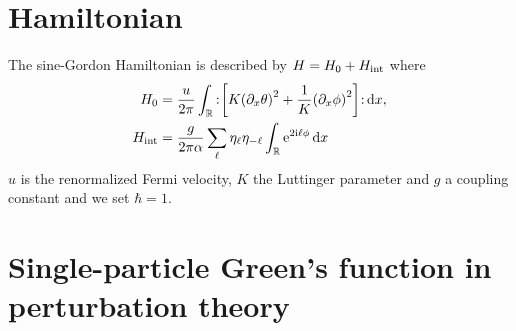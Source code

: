 \documentclass[english, parskip=full]{scrartcl}
\title{\titel}
\author{\autor}
\date{\today}
\begin{document}
\maketitle  %

\section{Hamiltonian}
The sine-Gordon Hamiltonian is described by $H=H_0+H_{\text{int}}$ where
\begin{align}
H_0 &= \frac{u}{2\pi} \intr{\normord{\klb*{K\kla*{\partial_x\theta}^2 + \frac{1}{K} \kla*{\partial_x\phi}^2}}}{x},\\
H_\Text{int} &= \frac{g}{2\pi\alpha} \sum_\ell \eta_{\ell}\eta_{-\ell} \intr{\powe{2\i\ell \phi}}{x}
\end{align}
$u$ is the renormalized Fermi velocity, $K$ the Luttinger parameter and $g$ a coupling constant and we set $\hbar=1$.
\section{Single-particle Green's function in perturbation theory}


\end{document}
